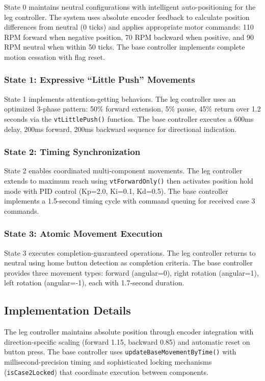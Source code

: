 State 0 maintains neutral configurations with intelligent auto-positioning for the leg controller. The system uses absolute encoder feedback to calculate position differences from neutral (0 ticks) and applies appropriate motor commands: 110 RPM forward when negative position, 70 RPM backward when positive, and 90 RPM neutral when within 50 ticks. The base controller implements complete motion cessation with flag reset.

\subsubsection{State 1: Expressive ``Little Push'' Movements}

State 1 implements attention-getting behaviors. The leg controller uses an optimized 3-phase pattern: 50\% forward extension, 5\% pause, 45\% return over 1.2 seconds via the \texttt{vtLittlePush()} function. The base controller executes a 600ms delay, 200ms forward, 200ms backward sequence for directional indication.

\subsubsection{State 2: Timing Synchronization}

State 2 enables coordinated multi-component movements. The leg controller extends to maximum reach using \texttt{vtForwardOnly()} then activates position hold mode with PID control (Kp=2.0, Ki=0.1, Kd=0.5). The base controller implements a 1.5-second timing cycle with command queuing for received case 3 commands.

\subsubsection{State 3: Atomic Movement Execution}

State 3 executes completion-guaranteed operations. The leg controller returns to neutral using home button detection as completion criteria. The base controller provides three movement types: forward (angular=0), right rotation (angular=1), left rotation (angular=-1), each with 1.7-second duration.

\subsection{Implementation Details}

The leg controller maintains absolute position through encoder integration with direction-specific scaling (forward 1.15, backward 0.85) and automatic reset on button press. The base controller uses \texttt{updateBaseMovementByTime()} with millisecond-precision timing and sophisticated locking mechanisms (\texttt{isCase2Locked}) that coordinate execution between components.

